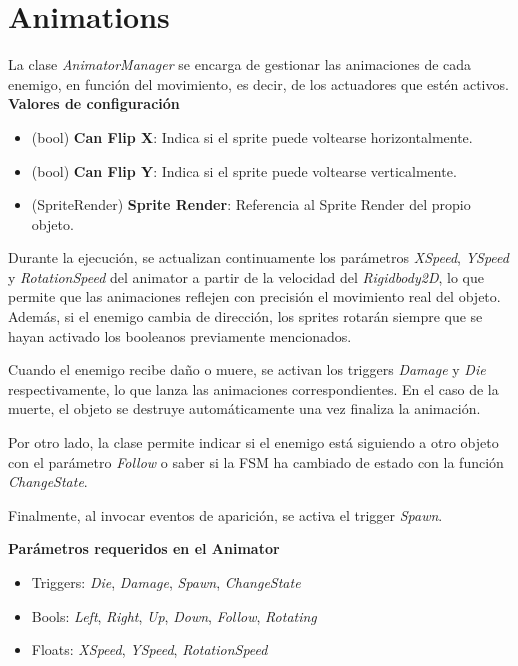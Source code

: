 \section{Animations}
La clase \textit{AnimatorManager} se encarga de gestionar las animaciones de cada enemigo, en función del movimiento, es decir, de los actuadores que estén activos.\\

\textbf{Valores de configuración}
\begin{itemize}
	\item (bool) \textbf{Can Flip X}: Indica si el sprite puede voltearse horizontalmente.
	\item (bool) \textbf{Can Flip Y}: Indica si el sprite puede voltearse verticalmente. 
	\item (SpriteRender) \textbf{Sprite Render}: Referencia al Sprite Render del propio objeto.
\end{itemize}

Durante la ejecución, se actualizan continuamente los parámetros \textit{XSpeed},  \textit{YSpeed}  y  \textit{RotationSpeed}  del animator a partir de la velocidad del \textit{Rigidbody2D}, lo que permite que las animaciones reflejen con precisión el movimiento real del objeto. Además, si el enemigo cambia de dirección, los sprites rotarán siempre que se hayan activado los booleanos previamente mencionados.

Cuando el enemigo recibe daño o muere, se activan los triggers \textit{Damage} y \textit{Die} respectivamente, lo que lanza las animaciones correspondientes. En el caso de la muerte, el objeto se destruye automáticamente una vez finaliza la animación. 

Por otro lado, la clase permite indicar si el enemigo está siguiendo a otro objeto con el parámetro \textit{Follow} o saber si la FSM ha cambiado de estado con la función \textit{ChangeState}.

Finalmente, al invocar eventos de aparición, se activa el trigger \textit{Spawn}.

\textbf{Parámetros requeridos en el Animator}
\begin{itemize}
	\item Triggers: \textit{Die}, \textit{Damage}, \textit{Spawn}, \textit{ChangeState}
	\item Bools: \textit{Left}, \textit{Right}, \textit{Up}, \textit{Down}, \textit{Follow}, \textit{Rotating}
	\item Floats: \textit{XSpeed}, \textit{YSpeed}, \textit{RotationSpeed}
\end{itemize}

